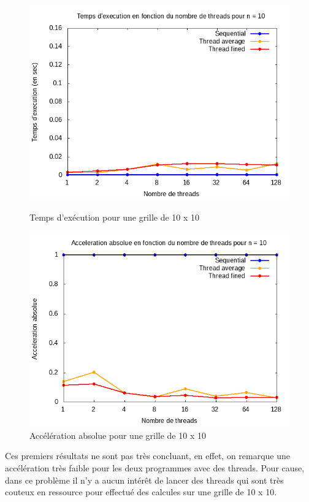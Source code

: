 \documentclass[10pt,a4paper]{article}
\begin{document}
\begin{figure}[h]
  \centering
  \begin{minipage}[b]{0.49\textwidth}
	\includegraphics[width=\textwidth]{./Time/size_10_time.png}
    \caption{Temps d'exécution pour une grille de 10 x 10}
  \end{minipage}
  \hfill
  \begin{minipage}[b]{0.49\textwidth}
    \includegraphics[width=\textwidth]{./Time/size_10_acceleration.png}
    \caption{Accélération absolue pour une grille de 10 x 10}
  \end{minipage}
\end{figure}
\hfill \break
Ces premiers résultats ne sont pas très concluant, en effet, on remarque une accélération très faible pour les deux programmes avec des threads. Pour cause, dans ce problème il n'y a aucun intérêt de lancer  des threads qui sont très couteux en ressource pour effectué des calcules sur une grille de 10 x 10.
\end{document}
